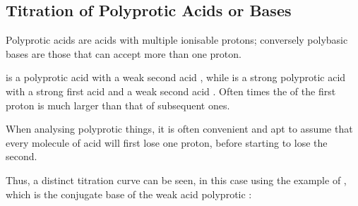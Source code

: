 









		\pagebreak
		\subsection{Titration of Polyprotic Acids or Bases}

			Polyprotic acids are acids with multiple ionisable protons; conversely polybasic bases are those that can accept more than one
			proton.

			 is a polyprotic acid with a weak second acid , while  is a strong polyprotic acid with a strong
			first acid and a weak second acid . Often times the \Ka{} of the first proton is much larger than that of subsequent ones.

			When analysing polyprotic things, it is often convenient and apt to assume that every molecule of acid will first lose one proton,
			before starting to lose the second.

			Thus, a distinct titration curve can be seen, in this case using the example of , which is the conjugate base of
			the weak acid polyprotic :



